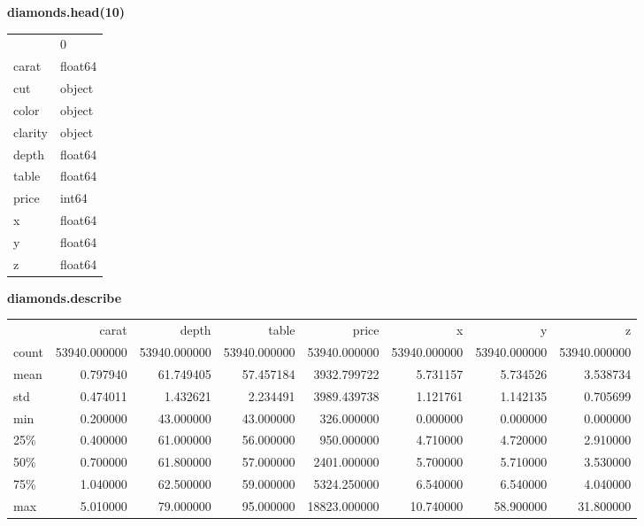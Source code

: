 \textbf{diamonds.head(10)}
\begin{center}
	\begin{tabular}{ll}
		{} &        0 \\
		carat   &  float64 \\
		cut     &   object \\
		color   &   object \\
		clarity &   object \\
		depth   &  float64 \\
		table   &  float64 \\
		price   &    int64 \\
		x       &  float64 \\
		y       &  float64 \\
		z       &  float64 \\
	\end{tabular}
\end{center}

\textbf{diamonds.describe}
\begin{center}
	\footnotesize
	\begin{tabular}{lrrrrrrr}
		{} &         carat &         depth &         table &         price &             x &             y &             z \\
		count &  53940.000000 &  53940.000000 &  53940.000000 &  53940.000000 &  53940.000000 &  53940.000000 &  53940.000000 \\
		mean  &      0.797940 &     61.749405 &     57.457184 &   3932.799722 &      5.731157 &      5.734526 &      3.538734 \\
		std   &      0.474011 &      1.432621 &      2.234491 &   3989.439738 &      1.121761 &      1.142135 &      0.705699 \\
		min   &      0.200000 &     43.000000 &     43.000000 &    326.000000 &      0.000000 &      0.000000 &      0.000000 \\
		25\%   &      0.400000 &     61.000000 &     56.000000 &    950.000000 &      4.710000 &      4.720000 &      2.910000 \\
		50\%   &      0.700000 &     61.800000 &     57.000000 &   2401.000000 &      5.700000 &      5.710000 &      3.530000 \\
		75\%   &      1.040000 &     62.500000 &     59.000000 &   5324.250000 &      6.540000 &      6.540000 &      4.040000 \\
		max   &      5.010000 &     79.000000 &     95.000000 &  18823.000000 &     10.740000 &     58.900000 &     31.800000 \\
	\end{tabular}
\end{center}

